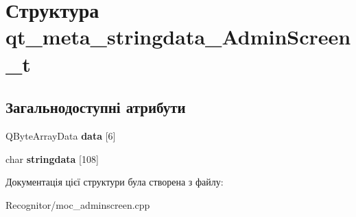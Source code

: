 \hypertarget{structqt__meta__stringdata__AdminScreen__t}{\section{Структура qt\-\_\-meta\-\_\-stringdata\-\_\-\-Admin\-Screen\-\_\-t}
\label{structqt__meta__stringdata__AdminScreen__t}
}
\subsection*{Загальнодоступні атрибути}
\begin{DoxyCompactItemize}
\item 
\hypertarget{structqt__meta__stringdata__AdminScreen__t_af98accc03a243a18f8dabcb467dd0455}{Q\-Byte\-Array\-Data {\bfseries data} \mbox{[}6\mbox{]}}\label{structqt__meta__stringdata__AdminScreen__t_af98accc03a243a18f8dabcb467dd0455}

\item 
\hypertarget{structqt__meta__stringdata__AdminScreen__t_a4c6518f37b23904a10245d10516cc4e1}{char {\bfseries stringdata} \mbox{[}108\mbox{]}}\label{structqt__meta__stringdata__AdminScreen__t_a4c6518f37b23904a10245d10516cc4e1}

\end{DoxyCompactItemize}


Документація цієї структури була створена з файлу\-:\begin{DoxyCompactItemize}
\item 
Recognitor/moc\-\_\-adminscreen.\-cpp\end{DoxyCompactItemize}
